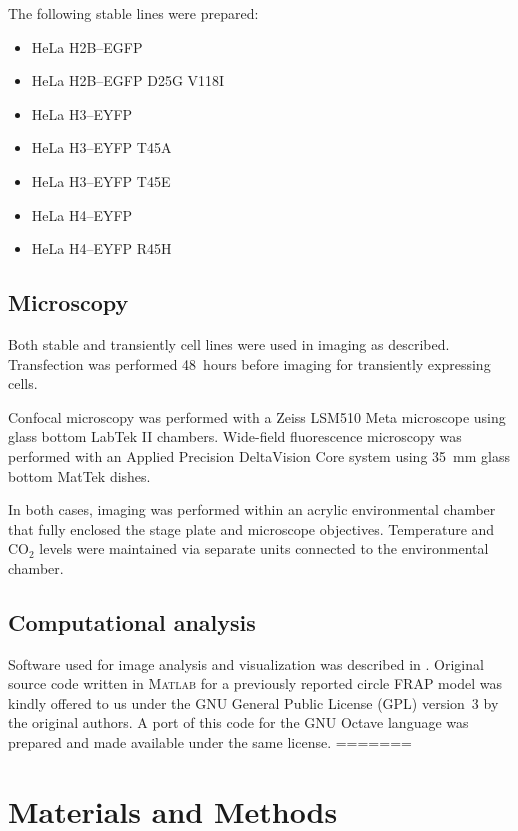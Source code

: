     The following stable lines were prepared:

    \begin{itemize}
      \item HeLa H2B--EGFP
      \item HeLa H2B--EGFP D25G V118I
      \item HeLa H3--EYFP
      \item HeLa H3--EYFP T45A
      \item HeLa H3--EYFP T45E
      \item HeLa H4--EYFP
      \item HeLa H4--EYFP R45H
    \end{itemize}

  \subsection{Microscopy}

    Both stable and transiently cell lines were used in imaging as described.
    Transfection was performed 48~hours before imaging for transiently
    expressing cells.

    Confocal microscopy was performed with a Zeiss LSM510 Meta microscope
    using glass bottom LabTek II chambers. Wide-field fluorescence microscopy
    was performed with an Applied Precision DeltaVision Core system
    using \SI{35}{\mm} glass bottom MatTek dishes.

    In both cases, imaging was performed within an acrylic environmental
    chamber that fully enclosed the stage plate and microscope objectives.
    Temperature and CO$_2$ levels were maintained via separate units connected
    to the environmental chamber.

  \subsection{Computational analysis}

    Software used for image analysis and visualization was described in
    . Original source code written in \textsc{Matlab} for a previously
    reported circle FRAP model \citep{mueller2008evidence} was kindly offered
    to us under the GNU General Public License (GPL) version~3 by the
    original authors. A port of this code for the GNU Octave language was
    prepared and made available under the same license.
=======
\section{Materials and Methods}

